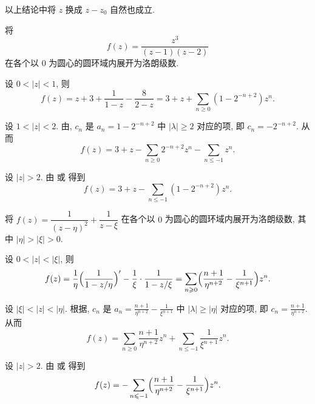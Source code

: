 以上结论中将 $z$ 换成 $z-z_0$ 自然也成立.

\begin{example}
  将
  \[
    f(z)=\dfrac{z^3}{(z-1)(z-2)}
  \]
  在各个以 $0$ 为圆心的圆环域内展开为洛朗级数. 
\end{example}

\begin{solution}\delspace
  \begin{enumnopar}[(i)]
    \item 设 $0<|z|<1$, 则
      \[
        f(z)=z+3+\frac1{1-z}-\frac8{2-z}=3+z+\sum_{n\ge 0}(1-2^{-n+2})z^n.
      \]
    \item 设 $1<|z|<2$. 由, $c_n$ 是 $a_n=1-2^{-n+2}$ 中 $|\lambda|\ge 2$ 对应的项, 即 $c_n=-2^{-n+2}$. 从而
      \[
        f(z)=3+z-\sum_{n\ge0}2^{-n+2}z^n-\sum_{n\le-1}z^n.
      \]
    \item 设 $|z|>2$. 由 或 得到
    \[
      f(z)=3+z-\sum_{n\le -1}(1-2^{-n+2})z^n.
    \]
  \end{enumnopar}
\end{solution}

\begin{example}
  将 $f(z)=\dfrac1{(z-\eta)^2}+\dfrac1{z-\xi}$ 在各个以 $0$ 为圆心的圆环域内展开为洛朗级数, 其中 $|\eta|>|\xi|>0$. 
\end{example}

\begin{solution}\delspace
  \begin{enumnopar}[(i)]
    \item 设 $0<|z|<|\xi|$, 则
      \[
         f(z)
        =\frac1{\eta}\Bigl(\frac1{1-z/\eta}\Bigr)'-\frac1\xi\cdot\frac1{1-z/\xi}
        =\sum_{n\ge 0}\Bigl(\frac{n+1}{\eta^{n+2}}-\frac1{\xi^{n+1}}\Bigr)z^n.
      \]
    \item 设 $|\xi|<|z|<|\eta|$. 根据, $c_n$ 是 $a_n=\displaystyle	\frac{n+1}{\eta^{n+2}}-\frac1{\xi^{n+1}}$ 中 $|\lambda|\ge |\eta|$ 对应的项, 即 $c_n=\displaystyle	\frac{n+1}{\eta^{n+2}}$. 从而
      \[
         f(z)
        =\sum_{n\ge 0}\frac{n+1}{\eta^{n+2}}z^n+\sum_{n\le -1}\frac1{\xi^{n+1}}z^n.
      \]
    \item 设 $|z|>2$. 由 或 得到
      \[
         f(z)
        =-\sum_{n\le -1}\Bigl(\frac{n+1}{\eta^{n+2}}-\frac1{\xi^{n+1}}\Bigr)z^n.
      \]
  \end{enumnopar}
\end{solution}



